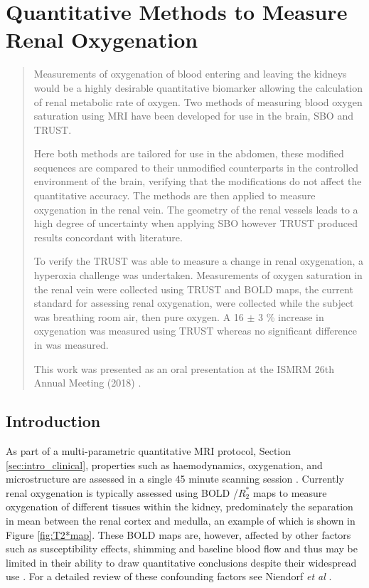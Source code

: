 \chapter{Quantitative Methods to Measure Renal Oxygenation}
\label{chap:TRUST}
\newpage
\begin{abstract}
	Measurements of oxygenation of blood entering and leaving the kidneys would be a highly desirable quantitative biomarker allowing the calculation of renal metabolic rate of oxygen. Two methods of measuring blood oxygen saturation using \acs{MRI} have been developed for use in the brain,  \ac{SBO} and \ac{TRUST}.
	
	Here both methods are tailored for use in the abdomen, these modified sequences are compared to their unmodified counterparts in the controlled environment of the brain, verifying that the modifications do not affect the quantitative accuracy. The methods are then applied to measure oxygenation in the renal vein. The geometry of the renal vessels leads to a high degree of uncertainty when applying \ac{SBO} however \ac{TRUST} produced results concordant with literature.
	
	To verify the \ac{TRUST} was able to measure a change in renal oxygenation, a hyperoxia challenge was undertaken. Measurements of oxygen saturation in the renal vein were collected using \ac{TRUST} and \acs{BOLD} \ttwostar maps, the current standard for assessing renal oxygenation, were collected while the subject was breathing room air, then pure oxygen. A 16 $\pm$ 3 \% increase in oxygenation was measured using \ac{TRUST} whereas no significant difference in \ttwostar was measured. 
	
	This work was presented as an oral presentation at the \ac{ISMRM} 26th Annual Meeting (2018) \cite{daniel_applying_2018}.
	
\end{abstract}
\newpage
\acresetall

\section{Introduction}
As part of a multi-parametric quantitative \ac{MRI} protocol, Section \ref{sec:intro_clinical}, properties such as haemodynamics, oxygenation, and microstructure are assessed in a single 45 minute scanning session \cite{cox_multiparametric_2017, buchanan_quantitative_2019}. Currently renal oxygenation is typically assessed using \ac{BOLD} \ttwostar/$R_2^*$ maps to measure oxygenation of different tissues within the kidney, predominately the separation in mean \ttwostar between the renal cortex and medulla, an example of which is shown in Figure \ref{fig:T2*map}. These \ac{BOLD} \ttwostar maps are, however, affected by other factors such as susceptibility effects, shimming and baseline blood flow and thus may be limited in their ability to draw quantitative conclusions despite their widespread use \cite{pruijm_blood_2017}. For a detailed review of these confounding factors see Niendorf \textit{et al} \cite{niendorf_how_2014}.

